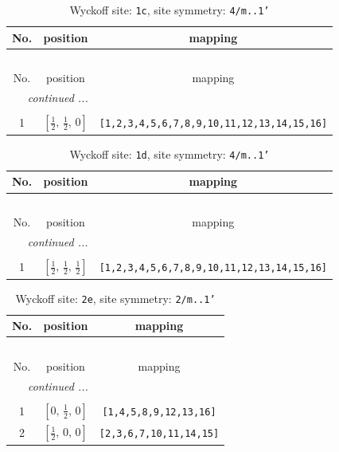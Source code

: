 \documentclass[fleqn,8pt]{jsarticle}
\begin{document}
\begin{longtable}{ccc}
\caption{Wyckoff site: {\tt 1c}, site symmetry: {\tt 4/m..1'}}
 \\
 \hline \hline
No. & position & mapping \\ \hline \endfirsthead

\multicolumn{2}{l}{\tablename\ \thetable{}} \\
 \hline \hline
No. & position & mapping \\ \hline \endhead

 \hline \hline
\multicolumn{2}{r}{\footnotesize\it continued ...} \\ \endfoot

 \hline \hline
\multicolumn{2}{r}{} \\ \endlastfoot

1 & $\left[ \frac{1}{2},\, \frac{1}{2},\, 0 \right]$ & {\tt [1,2,3,4,5,6,7,8,9,10,11,12,13,14,15,16]} \\
\end{longtable}
\renewcommand{\arraystretch}{1.2}
\begin{longtable}{ccc}
\caption{Wyckoff site: {\tt 1d}, site symmetry: {\tt 4/m..1'}}
 \\
 \hline \hline
No. & position & mapping \\ \hline \endfirsthead

\multicolumn{2}{l}{\tablename\ \thetable{}} \\
 \hline \hline
No. & position & mapping \\ \hline \endhead

 \hline \hline
\multicolumn{2}{r}{\footnotesize\it continued ...} \\ \endfoot

 \hline \hline
\multicolumn{2}{r}{} \\ \endlastfoot

1 & $\left[ \frac{1}{2},\, \frac{1}{2},\, \frac{1}{2} \right]$ & {\tt [1,2,3,4,5,6,7,8,9,10,11,12,13,14,15,16]} \\
\end{longtable}
\renewcommand{\arraystretch}{1.2}
\begin{longtable}{ccc}
\caption{Wyckoff site: {\tt 2e}, site symmetry: {\tt 2/m..1'}}
 \\
 \hline \hline
No. & position & mapping \\ \hline \endfirsthead

\multicolumn{2}{l}{\tablename\ \thetable{}} \\
 \hline \hline
No. & position & mapping \\ \hline \endhead

 \hline \hline
\multicolumn{2}{r}{\footnotesize\it continued ...} \\ \endfoot

 \hline \hline
\multicolumn{2}{r}{} \\ \endlastfoot

1 & $\left[ 0,\, \frac{1}{2},\, 0 \right]$ & {\tt [1,4,5,8,9,12,13,16]} \\ \hline
2 & $\left[ \frac{1}{2},\, 0,\, 0 \right]$ & {\tt [2,3,6,7,10,11,14,15]} \\
\end{longtable}
\end{document}
